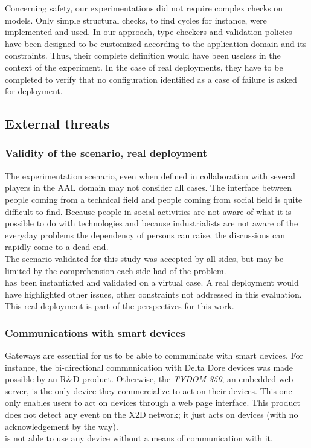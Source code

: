 Concerning safety, our experimentations did not require complex checks on models. Only simple structural checks, to find cycles for instance, were implemented and used.
In our approach, type checkers and validation policies have been designed to be customized according to the application domain and its constraints. Thus, their complete definition would have been useless in the context of the experiment. In the case of real deployments, they have to be completed to verify that no configuration identified as a case of failure is asked for deployment.

\subsection{External threats}

\subsubsection{Validity of the scenario, real deployment}

The experimentation scenario, even when defined in collaboration with several players in the AAL domain may not consider all cases. The interface between people coming from a technical field and people coming from social field is quite difficult to find. Because people in social activities are not aware of what it is possible to do with technologies and because industrialists are not aware of the everyday problems the dependency of persons can raise, the discussions can rapidly come to a dead end.\\
The scenario validated for this study was accepted by all sides, but may be limited by the comprehension each side had of the problem.\\

\enti{} has been instantiated and validated on a virtual case. A real deployment would have highlighted other issues, other constraints not addressed in this evaluation. This real deployment is part of the perspectives for this work.


\subsubsection{Communications with smart devices}

Gateways are essential for us to be able to communicate with smart devices. For instance, the bi-directional communication with Delta Dore devices was made possible by an R\&D product. Otherwise, the {\it TYDOM 350}, an embedded web server, is the only device they commercialize to act on their devices. This one only enables users to act on devices through a web page interface. This product does not detect any event on the X2D network; it just acts on devices (with no acknowledgement by the way).\\
\enti{} is not able to use any device without a means of communication with it.

